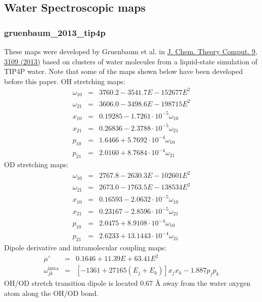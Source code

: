 \documentclass{article}
\begin{document}
\subsection{\label{sec:wmaps} Water Spectroscopic maps}
\subsubsection{gruenbaum\_2013\_tip4p}
These maps were developed by Gruenbaum et al. in \href{https://pubs.acs.org/doi/10.1021/ct400292q}{J. Chem. Theory Comput. 9, 3109 (2013)} based on clusters
of water molecules from a liquid-state simulation of TIP4P water. Note that some of the maps shown below have been
developed before this paper.
OH stretching maps:
\begin{eqnarray}
\omega_{10} &=& 3760.2 - 3541.7E-152677E^2 \nonumber\\
\omega_{21} &=& 3606.0 - 3498.6E - 198715E^2 \nonumber \\
x_{10} &=& 0.19285 - 1.7261\cdot 10^{-5} \omega_{10} \nonumber \\
x_{21} &=& 0.26836 - 2.3788\cdot 10^{-5} \omega_{21} \nonumber \\
p_{10} &=& 1.6466 + 5.7692\cdot 10^{-4} \omega_{10} \nonumber \\
p_{21} &=& 2.0160 + 8.7684\cdot 10^{-4} \omega_{21} \nonumber 
\end{eqnarray}
OD stretching maps:
\begin{eqnarray}
\omega_{10} &=& 2767.8 - 2630.3E-102601E^2 \nonumber\\
\omega_{21} &=& 2673.0 - 1763.5E - 138534E^2 \nonumber \\
x_{10} &=& 0.16593 - 2.0632\cdot 10^{-5} \omega_{10} \nonumber \\
x_{21} &=& 0.23167 - 2.8596\cdot 10^{-5} \omega_{21} \nonumber \\
p_{10} &=& 2.0475 + 8.9108\cdot 10^{-4} \omega_{10} \nonumber \\
p_{21} &=& 2.6233 + 13.1443\cdot 10^{-4} \omega_{21} \nonumber 
\end{eqnarray}
Dipole derivative and intramolecular coupling maps:
\begin{eqnarray}
\mu' &=& 0.1646 + 11.39E + 63.41E^2 \nonumber \\
\omega_{jk}^\text{intra}&=& [-1361 + 27165(E_j + E_k)]x_jx_k - 1.887 p_j p_k \nonumber
\end{eqnarray}
OH/OD stretch transition dipole is located 0.67 \AA{} away from the water oxygen atom along the OH/OD bond.
\end{document}
